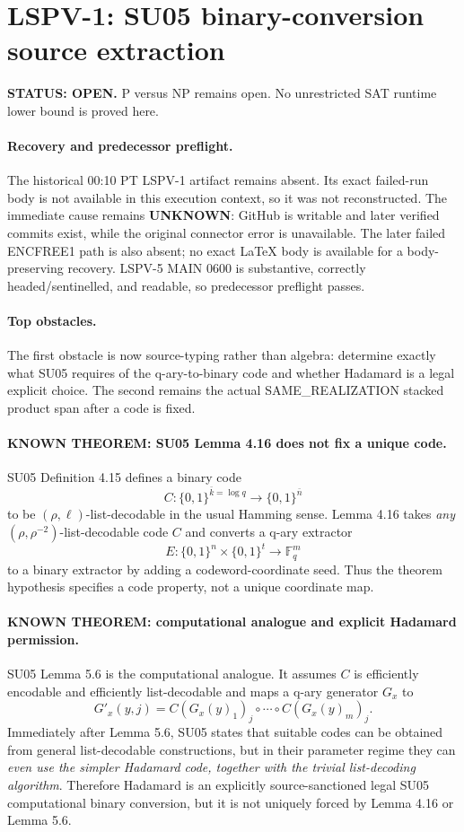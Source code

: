 \documentclass[11pt]{article}
\begin{document}
\section*{LSPV-1: SU05 binary-conversion source extraction}
\textbf{STATUS: OPEN.} P versus NP remains open. No unrestricted SAT runtime lower bound is proved here.

\paragraph{Recovery and predecessor preflight.}
The historical 00:10 PT LSPV-1 artifact remains absent. Its exact failed-run body is not available in this execution context, so it was not reconstructed. The immediate cause remains \textbf{UNKNOWN}: GitHub is writable and later verified commits exist, while the original connector error is unavailable. The later failed ENCFREE1 path is also absent; no exact LaTeX body is available for a body-preserving recovery. LSPV-5 MAIN 0600 is substantive, correctly headed/sentinelled, and readable, so predecessor preflight passes.

\paragraph{Top obstacles.}
The first obstacle is now source-typing rather than algebra: determine exactly what SU05 requires of the q-ary-to-binary code and whether Hadamard is a legal explicit choice. The second remains the actual SAME\_REALIZATION stacked product span after a code is fixed.

\paragraph{KNOWN THEOREM: SU05 Lemma 4.16 does not fix a unique code.}
SU05 Definition 4.15 defines a binary code
\[
C:\{0,1\}^{\bar k=\log q}\to\{0,1\}^{\bar n}
\]
to be $(\rho,\ell)$-list-decodable in the usual Hamming sense. Lemma 4.16 takes \emph{any} $(\rho,\rho^{-2})$-list-decodable code $C$ and converts a q-ary extractor
\[
E:\{0,1\}^n\times\{0,1\}^t\to\mathbb F_q^m
\]
to a binary extractor by adding a codeword-coordinate seed. Thus the theorem hypothesis specifies a code property, not a unique coordinate map.

\paragraph{KNOWN THEOREM: computational analogue and explicit Hadamard permission.}
SU05 Lemma 5.6 is the computational analogue. It assumes $C$ is efficiently encodable and efficiently list-decodable and maps a q-ary generator $G_x$ to
\[
G'_x(y,j)=
C(G_x(y)_1)_j\circ\cdots\circ C(G_x(y)_m)_j.
\]
Immediately after Lemma 5.6, SU05 states that suitable codes can be obtained from general list-decodable constructions, but in their parameter regime they can \emph{even use the simpler Hadamard code, together with the trivial list-decoding algorithm}. Therefore Hadamard is an explicitly source-sanctioned legal SU05 computational binary conversion, but it is not uniquely forced by Lemma 4.16 or Lemma 5.6.
\end{document}
